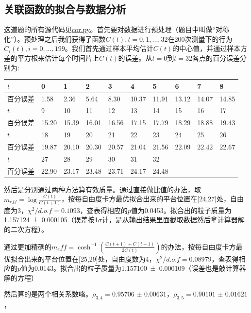 \documentclass[UTF8,size=9.5]{ctexart}
\begin{document}
\subsection{关联函数的拟合与数据分析}
这道题的所有源代码见\href{./cor.py}{cor.py}。首先要对数据进行预处理（题目中叫做“对称化”）。预处理之后我们获得了函数$C(t),t=0,1,...,32$在200次测量下的行为$C_i(t),i=0,...,199$。我们首先通过样本平均估计$C(t)$的中心值，并通过样本方差的平方根来估计每个时间片上$C(t)$的误差。从$t=0$到$t=32$各点的百分误差分别为:
\begin{center}
\begin{tabu} to\linewidth {X[c,-10]|X[c]X[c]X[c]X[c]X[c]X[c]X[c]X[c]X[c]}
\hline
$t$&0	&1	&2	&3	&4	&5	&6	&7	&8\\
\hline
百分误差&1.58 	&2.36 	&5.64 	&8.30 	&10.37 	&11.91 	&13.12 	&14.07 	&14.85\\
\hline\hline
$t$&9	&10	&11	&12	&13	&14	&15	&16	&17\\
\hline
百分误差&15.20 	&15.39 	&16.01 	&16.56 	&17.15 	&17.79 	&18.29 	&18.88 	&19.43\\
\hline\hline
$t$&18	&19	&20	&21	&22	&23	&24	&25	&26\\
\hline
百分误差&19.87 	&20.10 	&20.30 	&20.57 	&21.04 	&21.56 	&22.09 	&22.42 	&22.67\\
\hline\hline
$t$&27	&28	&29	&30	&31	&32	&	&	&\\
\hline
百分误差&22.90 	&23.17 	&23.48 	&23.71 	&24.17 	&24.48 	&	&	&\\
\hline
\end{tabu}\end{center}
然后是分别通过两种方法算有效质量。通过直接做比值的办法，取$m_{eff}=\log\frac{C(t)}{C(t+1)}$，按每自由度卡方最优拟合出来的平台位置在[24,27]处，自由度为3，$\chi^2/d.o.f=0.1093$，查表得相应的$p$值为0.0453。拟合出的粒子质量为\num{1.157124(105)}（误差按1$\sigma$计，是从输出结果里面截取数据然后拿计算器解的二次方程）。

通过更加精确的$m_eff=\cosh^{-1}(\frac{C(t+1)+C(t-1)}{2C(t)})$的办法，按每自由度卡方最优拟合出来的平台位置在[25,29]处，自由度数为4，$\chi^2/d.o.f=0.08979$，查表得相应的$p$值为0.0143。拟合出的粒子质量为\num{1.157100(109)}（误差也是敲计算器解的方程）

然后算的是两个相关系数咯。$\rho_{3,4}=\num{0.95706(631)}$，$\rho_{3,5}=\num{0.90101(1621)}$，
\end{document}
